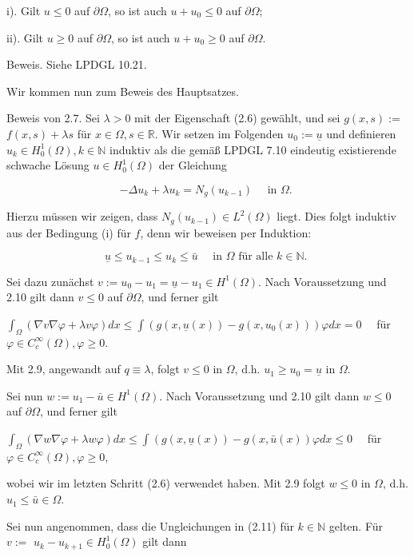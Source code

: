 \documentclass[10pt, letterpaper]{article}
\begin{document}
i). Gilt $u \leq 0$ auf $\partial \Omega$, so ist auch $u+u_{0} \leq 0$ auf $\partial \Omega$;

ii). Gilt $u \geq 0$ auf $\partial \Omega$, so ist auch $u+u_{0} \geq 0$ auf $\partial \Omega$.

Beweis. Siehe LPDGL 10.21.

Wir kommen nun zum Beweis des Hauptsatzes.

Beweis von 2.7. Sei $\lambda>0$ mit der Eigenschaft (2.6) gewählt, und sei $g(x, s):=$ $f(x, s)+\lambda s$ für $x \in \Omega, s \in \mathbb{R}$. Wir setzen im Folgenden $u_{0}:=\underline{u}$ und definieren $u_{k} \in H_{0}^{1}(\Omega), k \in \mathbb{N}$ induktiv als die gemäß LPDGL 7.10 eindeutig existierende schwache Lösung $u \in H_{0}^{1}(\Omega)$ der Gleichung

$$
-\Delta u_{k}+\lambda u_{k}=N_{g}\left(u_{k-1}\right) \quad \text { in } \Omega \text {. }
$$

Hierzu müssen wir zeigen, dass $N_{g}\left(u_{k-1}\right) \in L^{2}(\Omega)$ liegt. Dies folgt induktiv aus der Bedingung (i) für $f$, denn wir beweisen per Induktion:

$$
\underline{u} \leq u_{k-1} \leq u_{k} \leq \bar{u} \quad \text { in } \Omega \text { für alle } k \in \mathbb{N} \text {. }
$$

Sei dazu zunächst $v:=u_{0}-u_{1}=\underline{u}-u_{1} \in H^{1}(\Omega)$. Nach Voraussetzung und 2.10 gilt dann $v \leq 0$ auf $\partial \Omega$, und ferner gilt

$\int_{\Omega}(\nabla v \nabla \varphi+\lambda v \varphi) d x \leq \int\left(g(x, \underline{u}(x))-g\left(x, u_{0}(x)\right)\right) \varphi d x=0 \quad$ für $\varphi \in C_{c}^{\infty}(\Omega), \varphi \geq 0$.

Mit 2.9, angewandt auf $q \equiv \lambda$, folgt $v \leq 0$ in $\Omega$, d.h. $u_{1} \geq u_{0}=\underline{u}$ in $\Omega$.

Sei nun $w:=u_{1}-\bar{u} \in H^{1}(\Omega)$. Nach Voraussetzung und 2.10 gilt dann $w \leq 0$ auf $\partial \Omega$, und ferner gilt

$\int_{\Omega}(\nabla w \nabla \varphi+\lambda w \varphi) d x \leq \int\left(g(x, \underline{u}(x))-g(x, \bar{u}(x)) \varphi d x \leq 0 \quad\right.$ für $\varphi \in C_{c}^{\infty}(\Omega), \varphi \geq 0$,

wobei wir im letzten Schritt (2.6) verwendet haben. Mit 2.9 folgt $w \leq 0$ in $\Omega$, d.h. $u_{1} \leq \bar{u} \in \Omega$.

Sei nun angenommen, dass die Ungleichungen in (2.11) für $k \in \mathbb{N}$ gelten. Für $v:=$ $u_{k}-u_{k+1} \in H_{0}^{1}(\Omega)$ gilt dann
\end{document}
